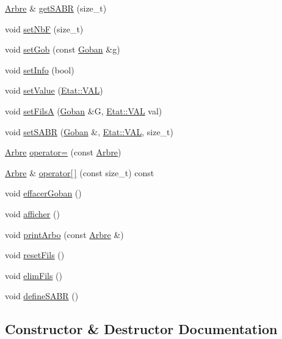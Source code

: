 \begin{DoxyCompactItemize}
\hyperlink{class_arbre}{Arbre} \& \hyperlink{class_arbre_a58b7b455cffd35ffc2aeb08dc978fd2d}{get\+S\+A\+BR} (size\+\_\+t)
\item 
void \hyperlink{class_arbre_acabc45692262e5ca9c2f7b410ddcd373}{set\+NbF} (size\+\_\+t)
\item 
void \hyperlink{class_arbre_a9e445e308cc393f7ff3e6076b461608a}{set\+Gob} (const \hyperlink{class_goban}{Goban} \&g)
\item 
void \hyperlink{class_arbre_a051e5328c63ba7ab6f6359f9f2f77105}{set\+Info} (bool)
\item 
void \hyperlink{class_arbre_a8108ffdff578e323dd9e50cc105a5c04}{set\+Value} (\hyperlink{class_etat_af3ddb2296ffc379b7f3ad2bf832f294e}{Etat\+::\+V\+AL})
\item 
void \hyperlink{class_arbre_aceca304216a7f620926c2147c7c84acd}{set\+FilsA} (\hyperlink{class_goban}{Goban} \&G, \hyperlink{class_etat_af3ddb2296ffc379b7f3ad2bf832f294e}{Etat\+::\+V\+AL} val)
\item 
void \hyperlink{class_arbre_a08c9dd0d84f493d89cb8e2e4bd740a8b}{set\+S\+A\+BR} (\hyperlink{class_goban}{Goban} \&, \hyperlink{class_etat_af3ddb2296ffc379b7f3ad2bf832f294e}{Etat\+::\+V\+AL}, size\+\_\+t)
\item 
\hyperlink{class_arbre}{Arbre} \hyperlink{class_arbre_a9983712c900965e153ee7340f80e42c2}{operator=} (const \hyperlink{class_arbre}{Arbre})
\item 
\hyperlink{class_arbre}{Arbre} \& \hyperlink{class_arbre_a98d37af19d33de04350fe50c83f4a70d}{operator\mbox{[}$\,$\mbox{]}} (const size\+\_\+t) const
\item 
void \hyperlink{class_arbre_a8e5496c537aafd219a6b45bb356da2c0}{effacer\+Goban} ()
\item 
void \hyperlink{class_arbre_a970de955ffdbbd5894e0fa0c40c4e69e}{afficher} ()
\item 
void \hyperlink{class_arbre_ac6329911b0037ca669e6ef2e12a178c9}{print\+Arbo} (const \hyperlink{class_arbre}{Arbre} \&)
\item 
void \hyperlink{class_arbre_a70585b1d341c1e0c262b2b4a4f769b6d}{reset\+Fils} ()
\item 
void \hyperlink{class_arbre_a38451547e67670e3f0828a4d04cef04d}{elim\+Fils} ()
\item 
void \hyperlink{class_arbre_afecc9a49515e88dba06b10d1e0fadb76}{define\+S\+A\+BR} ()
\end{DoxyCompactItemize}


\subsection{Constructor \& Destructor Documentation}
\mbox{\label{class_arbre_a761f4a2c6a43f44b38d4ac6fc1cf5cae}} 
